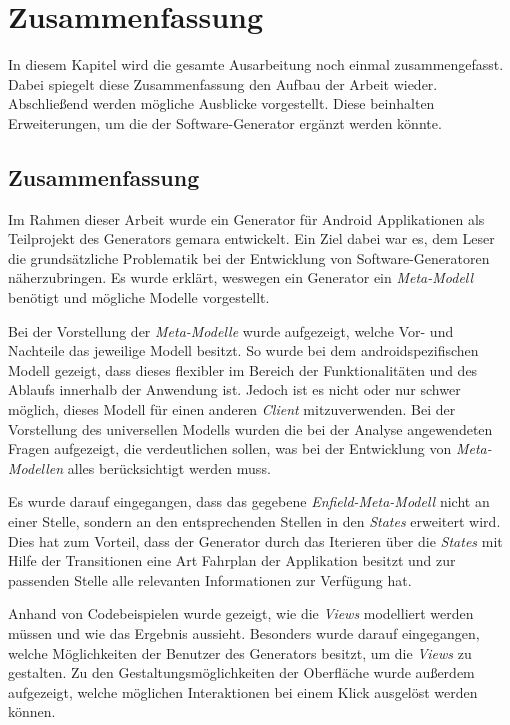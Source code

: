 \chapter{Zusammenfassung}
In diesem Kapitel wird die gesamte Ausarbeitung noch einmal zusammengefasst. Dabei spiegelt diese Zusammenfassung den Aufbau der Arbeit wieder. Abschließend werden mögliche Ausblicke vorgestellt. Diese beinhalten Erweiterungen, um die der Software-Generator ergänzt werden könnte.

\section{Zusammenfassung}
Im Rahmen dieser Arbeit wurde ein Generator für Android Applikationen als Teilprojekt des Generators \acf{gemara} entwickelt.
Ein Ziel dabei war es, dem Leser die grundsätzliche Problematik bei der Entwicklung von Software-Generatoren näherzubringen.
Es wurde erklärt, weswegen ein Generator ein \textit{Meta-Modell} benötigt und mögliche Modelle vorgestellt. 

Bei der Vorstellung der \textit{Meta-Modelle} wurde aufgezeigt, welche Vor- und Nachteile das jeweilige Modell besitzt. So wurde bei dem androidspezifischen Modell gezeigt, dass dieses flexibler im Bereich der Funktionalitäten und des Ablaufs innerhalb der Anwendung ist. Jedoch ist es nicht oder nur schwer möglich, dieses Modell für einen anderen \textit{Client} mitzuverwenden. Bei der Vorstellung des universellen Modells wurden die bei der Analyse angewendeten Fragen aufgezeigt, die verdeutlichen sollen, was bei der Entwicklung von \textit{Meta-Modellen} alles berücksichtigt werden muss.

Es wurde darauf eingegangen, dass das gegebene \textit{Enfield-Meta-Modell} nicht an einer Stelle, sondern an den entsprechenden Stellen in den \textit{States} erweitert wird. Dies hat zum Vorteil, dass der Generator durch das Iterieren über die \textit{States} mit Hilfe der Transitionen eine Art Fahrplan der Applikation besitzt und zur passenden Stelle alle relevanten Informationen zur Verfügung hat.

\newpage

Anhand von Codebeispielen wurde gezeigt, wie die \textit{Views} modelliert werden müssen und wie das Ergebnis aussieht. Besonders wurde darauf eingegangen, welche Möglichkeiten der Benutzer des Generators besitzt, um die \textit{Views} zu gestalten. Zu den Gestaltungsmöglichkeiten der Oberfläche wurde außerdem aufgezeigt, welche möglichen Interaktionen bei einem Klick ausgelöst werden können.

